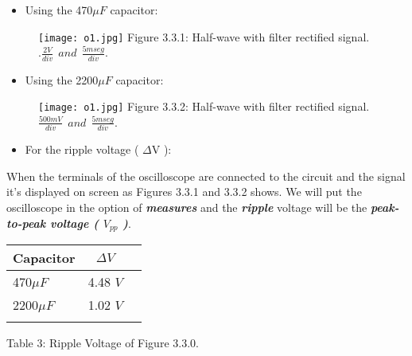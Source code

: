 \begin{multicols}{2}
\begin{itemize}
\item Using the 470$\mu F$ capacitor:
\end{itemize}

\begin{figure}[H]
\texttt{[image: o1.jpg]}
\centering \linebreak \linebreak Figure 3.3.1: Half-wave with filter rectified signal.
\linebreak .\linebreak $\frac{2 V}{div}\ \ and\ \ \frac{5mseg}{div}$.
\end{figure}

\begin{itemize}
\item Using the 2200$\mu F$ capacitor:
\end{itemize}

\begin{figure}[H]
\texttt{[image: o1.jpg]}
\centering \linebreak \linebreak Figure 3.3.2: Half-wave with filter rectified signal.
\linebreak \linebreak $\frac{500 mV}{div}\ \ and\ \ \frac{5mseg}{div}$.
\end{figure}
\end{multicols}

{\bfseries\itshape
\begin{itemize}
\item For the ripple voltage ( $\Delta$V ):
\end{itemize}}

When the terminals of the oscilloscope are connected to the circuit and the signal it's displayed on screen as Figures 3.3.1 and 3.3.2 shows. We will put the oscilloscope in the option of {\bfseries\itshape measures} and the {\bfseries\itshape ripple} voltage will be the {\bfseries\itshape peak-to-peak voltage ( $V_{pp}$ )}. \hfill \break

\begin{center}
\begin{tabular}[.5cm]{l c c }
\toprule
Capacitor & $\Delta V$  \\
\midrule
470$\mu F$ & 4.48 $V$ \\
\cmidrule{1-2}
2200$\mu F$ & 1.02 $V$ \\
\bottomrule
\linebreak
\end{tabular}
\centering \linebreak Table 3: Ripple Voltage of Figure 3.3.0.
\end{center} \hfill

\pagebreak
